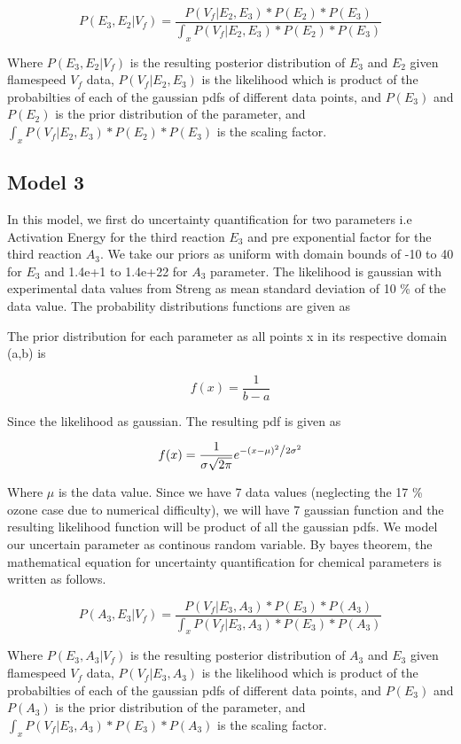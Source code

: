  $$P( E_3, E_2 |V_f ) = \frac{P(V_f| E_2,E_3)* P(E_2)* P(E_3)}{\int_x P(V_f|E_2,E_3)* P(E_2)*P(E_3)}$$ 
 
 \noindent Where  $P(E_3,E_2 |V_f)$ is the resulting posterior distribution of $E_3$ and $E_2$ given flamespeed $V_f$ data, $P(V_f| E_2 ,E_3)$ is the likelihood which is product of the probabilties of each of the gaussian pdfs of different data points, and $ P(E_3)$ and $P(E_2)$ is the prior distribution of the parameter, and $\int_x P(V_f|E_2,E_3)* P(E_2)*P(E_3)$ is the scaling factor.
 

\subsection{Model 3}


\noindent In this model, we first do uncertainty quantification for two parameters i.e Activation Energy for the third reaction $E_3$ and pre exponential factor for the third reaction $A_3$. We take our priors as uniform with domain bounds of -10 to 40 for $E_3$  and 1.4e+1 to 1.4e+22 for $A_3$  parameter. The likelihood is gaussian with experimental data values from Streng\cite{Streng} as mean standard deviation of 10 \% of the data value. The probability distributions functions are given as

\noindent The prior distribution for each parameter as all points x in its respective domain (a,b) is 

$$f(x) = \frac{1}{b -a}$$


\noindent Since the likelihood as gaussian. The resulting pdf is given as 

$$f(x) = \frac{1}{{\sigma \sqrt {2\pi } }}e^{{{ - \left( {x - \mu } \right)^2 } \mathord{\left/ {\vphantom {{ - \left( {x - \mu } \right)^2 } {2\sigma ^2 }}} \right. \kern-\nulldelimiterspace} {2\sigma ^2 }}} $$

  
\noindent Where $\mu$ is the data value. Since we have 7 data values (neglecting the 17 \% ozone case due to numerical difficulty), we will have 7 gaussian function and the resulting likelihood function will be product of all the gaussian pdfs. We model our uncertain parameter as continous random variable. By bayes theorem, the mathematical equation for uncertainty quantification for chemical parameters is written as follows. 

 $$P( A_3, E_3 |V_f ) = \frac{P(V_f| E_3,A_3)* P(E_3)* P(A_3)}{\int_x P(V_f|E_3,A_3)* P(E_3)*P(A_3)}$$ 
 
 \noindent Where  $P(E_3,A_3 |V_f)$ is the resulting posterior distribution of $A_3$ and $E_3$ given flamespeed $V_f$ data, $P(V_f| E_3 ,A_3)$ is the likelihood which is product of the probabilties of each of the gaussian pdfs of different data points, and $ P(E_3)$ and $P(A_3)$ is the prior distribution of the parameter, and $\int_x P(V_f|E_3,A_3)*P(E_3)*P(A_3)$ is the scaling factor.


